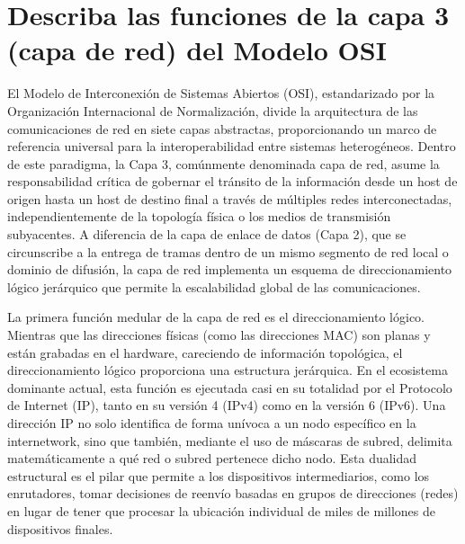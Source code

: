\documentclass[a4paper,12pt]{article}
\begin{document}
\renewcommand{\footrulewidth}{0.4pt}  %

\setcounter{page}{1}

\tableofcontents


\newpage

\section{Describa las funciones de la capa 3 (capa de red) del Modelo OSI}

El Modelo de Interconexión de Sistemas Abiertos (OSI), estandarizado por la Organización Internacional de Normalización, divide la arquitectura de las comunicaciones de red en siete capas abstractas, proporcionando un marco de referencia universal para la interoperabilidad entre sistemas heterogéneos. Dentro de este paradigma, la Capa 3, comúnmente denominada capa de red, asume la responsabilidad crítica de gobernar el tránsito de la información desde un host de origen hasta un host de destino final a través de múltiples redes interconectadas, independientemente de la topología física o los medios de transmisión subyacentes. A diferencia de la capa de enlace de datos (Capa 2), que se circunscribe a la entrega de tramas dentro de un mismo segmento de red local o dominio de difusión, la capa de red implementa un esquema de direccionamiento lógico jerárquico que permite la escalabilidad global de las comunicaciones.

La primera función medular de la capa de red es el direccionamiento lógico. Mientras que las direcciones físicas (como las direcciones MAC) son planas y están grabadas en el hardware, careciendo de información topológica, el direccionamiento lógico proporciona una estructura jerárquica. En el ecosistema dominante actual, esta función es ejecutada casi en su totalidad por el Protocolo de Internet (IP), tanto en su versión 4 (IPv4) como en la versión 6 (IPv6). Una dirección IP no solo identifica de forma unívoca a un nodo específico en la internetwork, sino que también, mediante el uso de máscaras de subred, delimita matemáticamente a qué red o subred pertenece dicho nodo. Esta dualidad estructural es el pilar que permite a los dispositivos intermediarios, como los enrutadores, tomar decisiones de reenvío basadas en grupos de direcciones (redes) en lugar de tener que procesar la ubicación individual de miles de millones de dispositivos finales.
\end{document}
